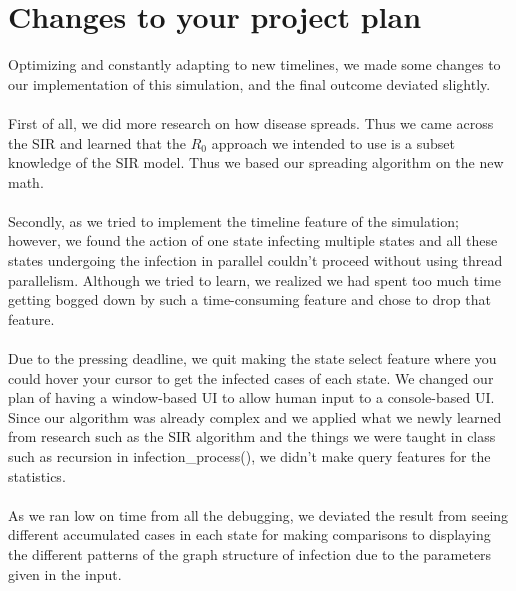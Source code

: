 \documentclass[12pt]{article}
\begin{document}
\section{Changes to your project plan}
Optimizing and constantly adapting to new timelines, we made some changes to our implementation of this simulation, and the final outcome deviated slightly.\\\\
First of all, we did more research on how disease spreads. Thus we came across the SIR and learned that the $R_0$ approach we intended to use is a subset knowledge of the SIR model. Thus we based our spreading algorithm on the new math.\\\\
Secondly, as we tried to implement the timeline feature of the simulation; however, we found the action of one state infecting multiple states and all these states undergoing the infection in parallel couldn't proceed without using thread parallelism. Although we tried to learn, we realized we had spent too much time getting bogged down by such a time-consuming feature and chose to drop that feature.\\\\
Due to the pressing deadline, we quit making the state select feature where you could hover your cursor to get the infected cases of each state. We changed our plan of having a window-based UI to allow human input to a console-based UI.
Since our algorithm was already complex and we applied what we newly learned from research such as the SIR algorithm and the things we were taught in class such as recursion in infection\_process(), we didn't make query features for the statistics.\\\\
As we ran low on time from all the debugging, we deviated the result from seeing different accumulated cases in each state for making comparisons to displaying the different patterns of the graph structure of infection due to the parameters given in the input.

\newpage
\end{document}
